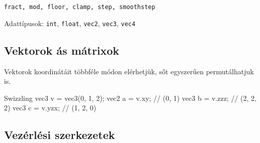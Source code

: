 \texttt{fract, mod, floor, clamp, step, smoothstep}

Adattípusok:
\texttt{int}, 
\texttt{float}, 
\texttt{vec2}, 
\texttt{vec3}, 
\texttt{vec4} 


\subsection*{Vektorok ás mátrixok}

Vektorok koordinátáit többféle módon elérhetjük, sőt egyszerűen permutálhatjuk is.

\begin{glsl}{Swizzling}
vec3 v = vec3(0, 1, 2);
vec2 a = v.xy;           // (0, 1)
vec3 b = v.zzz;          // (2, 2, 2)
vec3 c = v.yzx;          // (1, 2, 0)
\end{glsl}

\subsection*{Vezérlési szerkezetek}

